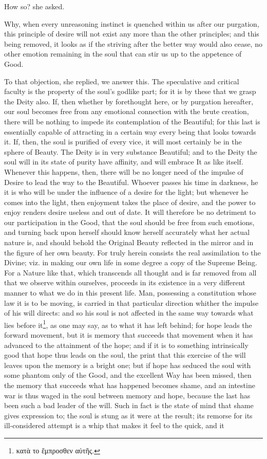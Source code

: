 How so? she asked.

Why, when every unreasoning instinct is quenched within us after our purgation, this principle of desire will not exist any more than the other principles; and this being removed, it looks as if the striving after the better way would also cease, no other emotion remaining in the soul that can stir us up to the appetence of Good.

To that objection, she replied, we answer this. The speculative and critical faculty is the property of the soul’s godlike part; for it is by these that we grasp the Deity also. If, then whether by forethought here, or by purgation hereafter, our soul becomes free from any emotional connection with the brute creation, there will be nothing to impede its contemplation of the Beautiful; for this last is essentially capable of attracting in a certain way every being that looks towards it. If, then, the soul is purified of every vice, it will most certainly be in the sphere of Beauty. The Deity is in very substance Beautiful; and to the Deity the soul will in its state of purity have affinity, and will embrace It as like itself. Whenever this happens, then, there will be no longer need of the impulse of Desire to lead the way to the Beautiful. Whoever passes his time in darkness, he it is who will be under the influence of a desire for the light; but whenever he comes into the light, then enjoyment takes the place of desire, and the power to enjoy renders desire useless and out of date. It will therefore be no detriment to our participation in the Good, that the soul should be free from such emotions, and turning back upon herself should know herself accurately what her actual nature is, and should behold the Original Beauty reflected in the mirror and in the figure of her own beauty. For truly herein consists the real assimilation to the Divine; viz. in making our own life in some degree a copy of the Supreme Being. For a Nature like that, which transcends all thought and is far removed from all that we observe within ourselves, proceeds in its existence in a very different manner to what we do in this present life. Man, possessing a constitution whose law it is to be moving, is carried in that particular direction whither the impulse of his will directs: and so his soul is not affected in the same way towards what lies before it\footnote{\textgreek{κατὰ το ἔμπροσθεν αὐτῆς}.}, as one may say, as to what it has left behind; for hope leads the forward movement, but it is memory that succeeds that movement when it has advanced to the attainment of the hope; and if it is to something intrinsically good that hope thus leads on the soul, the print that this exercise of the will leaves upon the memory is a bright one; but if hope has seduced the soul with some phantom only of the Good, and the excellent Way has been missed, then the memory that succeeds what has happened becomes shame, and an intestine war is thus waged in the soul between memory and hope, because the last has been such a bad leader of the will. Such in fact is the state of mind that shame gives expression to; the soul is stung as it were at the result; its remorse for its ill-considered attempt is a whip that makes it feel to the quick, and it 